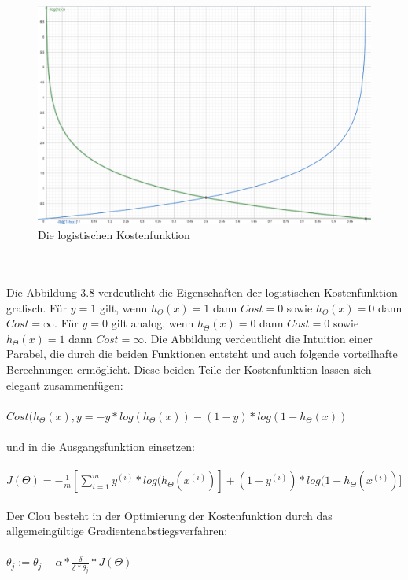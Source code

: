 \documentclass[a4paper]{scrreprt}
\begin{document}
\begin{figure}[hpt]
\centering
\includegraphics[scale=.44]{Abbildungen/Logistische_Regression_45}
\caption{Die logistischen Kostenfunktion}
\label{figure}
\end{figure}
\\\\
Die Abbildung 3.8 verdeutlicht die Eigenschaften der logistischen Kostenfunktion grafisch. Für $y=1$ gilt, wenn $h_{\Theta}(x)=1$ dann $Cost=0$ sowie $h_{\Theta}(x)=0$ dann $Cost=\infty$. Für $y=0$ gilt analog, wenn $h_{\Theta}(x)=0$ dann $Cost=0$ sowie $h_{\Theta}(x)=1$ dann $Cost=\infty$. Die Abbildung verdeutlicht die Intuition einer Parabel, die durch die beiden Funktionen entsteht und auch folgende vorteilhafte Berechnungen ermöglicht.
\newpage
Diese beiden Teile der Kostenfunktion lassen sich elegant zusammenfügen:\\\\
$Cost(h_{\Theta}(x),y=-y*log(h_{\Theta}(x))-(1-y)*log(1-h_{\Theta}(x))$\\\\
und in die Ausgangsfunktion einsetzen:\\\\
$J(\Theta)=-\frac{1}{m}[\sum \limits_{i=1}^{m}y^{(i)}*log(h_{\Theta}(x^{(i)})]+(1-y^{(i)})*log(1-h_{\Theta}(x^{(i)})]$\\\\
Der Clou besteht in der Optimierung der Kostenfunktion durch das allgemeingültige Gradientenabstiegsverfahren:\\\\
$\theta_{j}:=\theta_{j}-\alpha*\frac{\delta}{\delta*\theta_{j}}*J(\Theta)$\\\\
\end{document}
